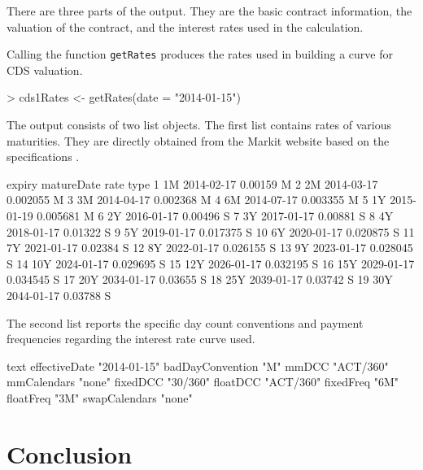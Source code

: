 \documentclass[a4paper]{article}
\begin{document}
There are three parts of the output. They are the basic contract
information, the valuation of the contract, and the interest rates
used in the calculation.

Calling the function \texttt{getRates} produces the rates used in
building a curve for CDS valuation. 

\begin{Schunk}
\begin{Sinput}
> cds1Rates <- getRates(date = "2014-01-15")
\end{Sinput}
\end{Schunk}

The output consists of two list objects. The first list contains rates
of various maturities. They are directly obtained from the Markit
website based on the specifications \citep{rates}.

\begin{Schunk}
\begin{Soutput}
   expiry matureDate     rate type
1      1M 2014-02-17  0.00159    M
2      2M 2014-03-17 0.002055    M
3      3M 2014-04-17 0.002368    M
4      6M 2014-07-17 0.003355    M
5      1Y 2015-01-19 0.005681    M
6      2Y 2016-01-17  0.00496    S
7      3Y 2017-01-17  0.00881    S
8      4Y 2018-01-17  0.01322    S
9      5Y 2019-01-17 0.017375    S
10     6Y 2020-01-17 0.020875    S
11     7Y 2021-01-17  0.02384    S
12     8Y 2022-01-17 0.026155    S
13     9Y 2023-01-17 0.028045    S
14    10Y 2024-01-17 0.029695    S
15    12Y 2026-01-17 0.032195    S
16    15Y 2029-01-17 0.034545    S
17    20Y 2034-01-17  0.03655    S
18    25Y 2039-01-17  0.03742    S
19    30Y 2044-01-17  0.03788    S
\end{Soutput}
\end{Schunk}

The second list reports the specific day count conventions and payment
frequencies regarding the interest rate curve used. 

\begin{Schunk}
\begin{Soutput}
                 text        
effectiveDate    "2014-01-15"
badDayConvention "M"         
mmDCC            "ACT/360"   
mmCalendars      "none"      
fixedDCC         "30/360"    
floatDCC         "ACT/360"   
fixedFreq        "6M"        
floatFreq        "3M"        
swapCalendars    "none"      
\end{Soutput}
\end{Schunk}



\section{Conclusion}
\end{document}
